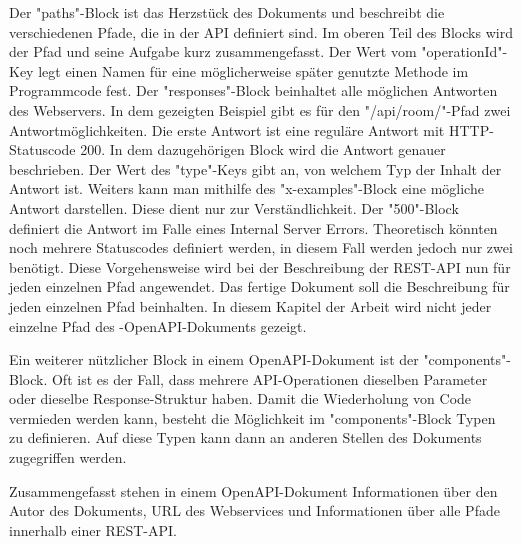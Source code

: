 Der "paths"-Block ist das Herzstück des Dokuments und beschreibt die verschiedenen Pfade, die in der API definiert sind. Im oberen Teil des Blocks wird der Pfad und seine Aufgabe kurz zusammengefasst. Der Wert vom "operationId"-Key legt einen Namen für eine möglicherweise später genutzte Methode im Programmcode fest. Der "responses"-Block beinhaltet alle möglichen Antworten des Webservers. In dem gezeigten Beispiel gibt es für den "/api/room/"-Pfad zwei Antwortmöglichkeiten. Die erste Antwort ist eine reguläre Antwort mit HTTP-Statuscode 200. In dem dazugehörigen Block wird die Antwort genauer beschrieben. Der Wert des "type"-Keys gibt an, von welchem Typ der Inhalt der Antwort ist. Weiters kann man mithilfe des "x-examples"-Block eine mögliche Antwort darstellen. Diese dient nur zur Verständlichkeit. Der "500"-Block definiert die Antwort im Falle eines Internal Server Errors. Theoretisch könnten noch mehrere Statuscodes definiert werden, in diesem Fall werden jedoch nur zwei benötigt. Diese Vorgehensweise wird bei der Beschreibung der REST-API nun für jeden einzelnen Pfad angewendet. Das fertige Dokument soll die Beschreibung für jeden einzelnen Pfad beinhalten. In diesem Kapitel der Arbeit wird nicht jeder einzelne Pfad des \ZELIA-OpenAPI-Dokuments gezeigt. \cite{OpenAPI}



Ein weiterer nützlicher Block in einem OpenAPI-Dokument ist der "components"-Block. Oft ist es der Fall, dass mehrere API-Operationen dieselben Parameter oder dieselbe Response-Struktur haben. Damit die Wiederholung von Code vermieden werden kann, besteht die Möglichkeit im "components"-Block Typen zu definieren. Auf diese Typen kann dann an anderen Stellen des Dokuments zugegriffen werden. \cite{OpenAPI}


Zusammengefasst stehen in einem OpenAPI-Dokument Informationen über den Autor des Dokuments, URL des Webservices und Informationen über alle Pfade innerhalb einer REST-API. \cite{OpenAPI}

